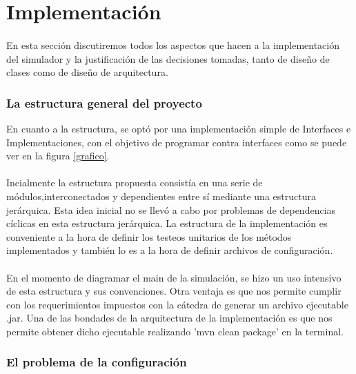 \documentclass{article}
\begin{document}
\section{Implementación}

\paragraph{}
En esta sección discutiremos todos los aspectos que hacen a la implementación del simulador y la justificación de las decisiones tomadas, tanto de diseño de clases como de diseño de arquitectura.

\subsubsection{La estructura general del proyecto}

En cuanto a la estructura, se optó por una implementación simple de Interfaces e Implementaciones, con el objetivo de programar contra interfaces como se puede ver en la figura \ref{grafico}. 

\paragraph{}
Incialmente la estructura propuesta consistía en una serie de módulos,interconectados y dependientes entre sí mediante una estructura jerárquica. Esta idea inicial no se llevó a cabo por problemas de dependencias cíclicas en esta estructura jerárquica. La estructura de la implementación es conveniente a la hora de definir los testeos unitarios de los métodos implementados y también lo es a la hora de definir archivos de configuración. 

\paragraph{}
En el momento de diagramar el main de la simulación, se hizo un uso intensivo de esta estructura y sus convenciones. Otra ventaja es que nos permite cumplir con los requerimientos impuestos con la cátedra de generar un archivo ejecutable .jar. Una de las bondades de la arquitectura de la implementación es que nos permite obtener dicho ejecutable realizando 'mvn clean package' en la terminal.

\subsubsection{El problema de la configuración}
\end{document}
